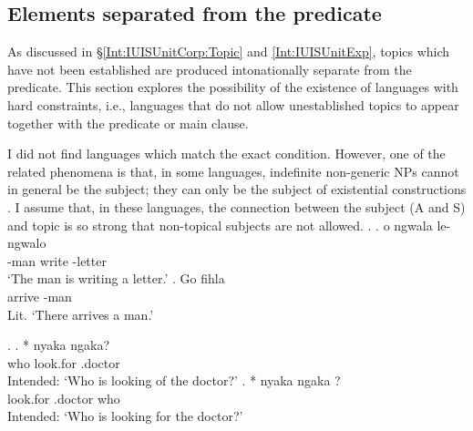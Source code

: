 \subsection{Elements separated from the predicate}\label{Disc:HardConst:Separated}

As discussed in \S \ref{Int:IUISUnitCorp:Topic} and \ref{Int:IUISUnitExp},
topics which have not been established are produced intonationally separate from the predicate.
This section explores the possibility of the existence of
languages with hard constraints,
i.e., languages that do not allow unestablished topics to appear together with the predicate or main clause.

I did not find languages which match the exact condition.
However, one of the related phenomena is that, in some languages,
indefinite non-generic NPs cannot in general be the subject;
they can only be the subject of existential constructions \cite[p.~173ff.]{givon76}.
I assume that, in these languages,
the connection between the subject (A and S) and topic is so strong
that non-topical subjects are not allowed.
%
\ex.
 \ag.  o ngwala le-ngwalo \\
      -man  write -letter \\
      `The man is writing a letter.'
 \bg. Go fihla  \\
       arrive -man \\
      Lit. `There arrives a man.'
     \hfill{\cite[p.~171]{zerbian06}}

%
\ex.
 \ag. *  nyaka ngaka? \\
       who  look.for .doctor \\
       Intended: `Who is looking of the doctor?'
 \bg. * nyaka ngaka ? \\
        look.for .doctor who \\
       Intended: `Who is looking for the doctor?'
     \hfill{\cite[p.~69]{zerbian06}}

